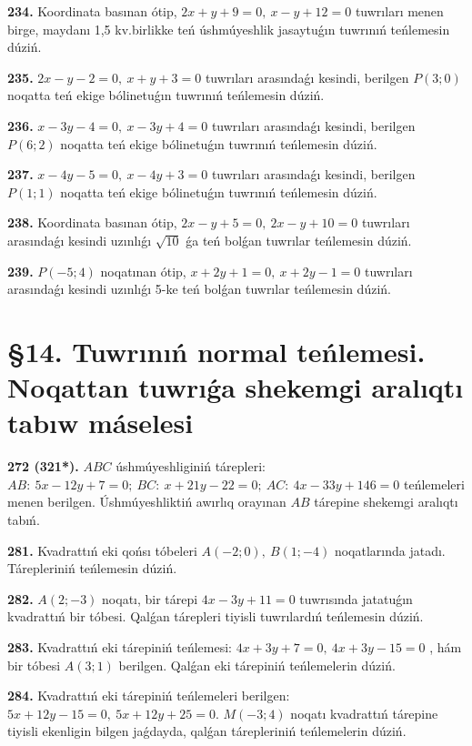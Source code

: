 \documentclass{article}
\begin{document}
\textbf{234.} Koordinata basınan ótip,
\(2x + y + 9 = 0,\ x - y + 12 = 0\) tuwrıları menen birge, maydanı
1,5 kv.birlikke teń úshmúyeshlik jasaytuǵın tuwrınıń teńlemesin dúziń.

\textbf{235.} \(2x - y - 2 = 0,\ x + y + 3 = 0\) tuwrıları
arasındaǵı kesindi, berilgen \(P(3;0)\) noqatta teń ekige bólinetuǵın
tuwrınıń teńlemesin dúziń.

\textbf{236.} \(x - 3y - 4 = 0,\ x - 3y + 4 = 0\) tuwrıları
arasındaǵı kesindi, berilgen \(P(6;2)\) noqatta teń ekige bólinetuǵın
tuwrınıń teńlemesin dúziń.

\textbf{237.} \(x - 4y - 5 = 0,\ x - 4y + 3 = 0\) tuwrıları
arasındaǵı kesindi, berilgen \(P(1;1)\) noqatta teń ekige bólinetuǵın
tuwrınıń teńlemesin dúziń.

\textbf{238.} Koordinata basınan ótip,
\(2x - y + 5 = 0,\ 2x - y + 10 = 0\) tuwrıları arasındaǵı kesindi
uzınlıǵı \(\sqrt{10}\) ǵa teń bolǵan tuwrılar teńlemesin dúziń.

\textbf{239.} \(P( - 5;4)\) noqatınan ótip,
\(x + 2y + 1 = 0,\ x + 2y - 1 = 0\) tuwrıları arasındaǵı kesindi
uzınlıǵı 5-ke teń bolǵan tuwrılar teńlemesin dúziń.

\section*{\S 14. Tuwrınıń normal teńlemesi. Noqattan tuwrıǵa shekemgi aralıqtı 
tabıw máselesi}

\textbf{272 (321*).} $ABC$ úshmúyeshliginiń tárepleri:
\(AB:\ 5x - 12y + 7 = 0;\ BC:\ x + 21y - 22 = 0;\ AC:\ 4x - 33y + 146 = 0\) 
teńlemeleri menen berilgen. Úshmúyeshliktiń awırlıq orayınan $AB$
tárepine shekemgi aralıqtı tabıń.

\textbf{281.} Kvadrattıń eki qońsı tóbeleri \(A( - 2;0),\ B(1; - 4)\) 
noqatlarında jatadı. Tárepleriniń teńlemesin dúziń.

\textbf{282.} \(A(2; - 3)\) noqatı, bir tárepi \(4x - 3y + 11 = 0\) 
tuwrısında jatatuǵın kvadrattıń bir tóbesi. Qalǵan tárepleri tiyisli
tuwrılardıń teńlemesin dúziń.

\textbf{283.} Kvadrattıń eki tárepiniń teńlemesi:
\(4x + 3y + 7 = 0,\ 4x + 3y - 15 = 0\) , hám bir tóbesi \(A(3;1)\) 
berilgen. Qalǵan eki tárepiniń teńlemelerin dúziń.

\textbf{284.} Kvadrattıń eki tárepiniń teńlemeleri berilgen:
\(5x + 12y - 15 = 0,\ 5x + 12y + 25 = 0.\) \(M( - 3;4)\) noqatı
kvadrattıń tárepine tiyisli ekenligin bilgen jaǵdayda, qalǵan
tárepleriniń teńlemelerin dúziń.
\end{document}
